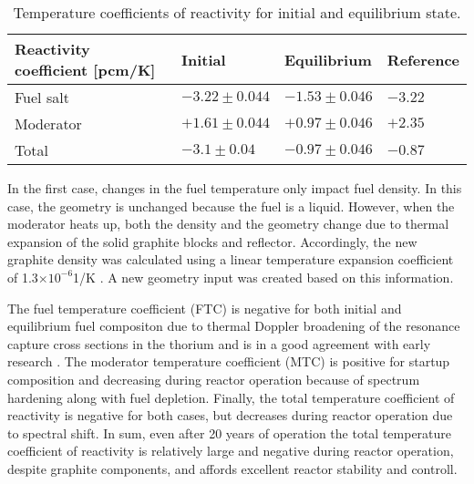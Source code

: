 \begin{table}[ht!]
  \centering
  \caption{Temperature coefficients of reactivity for initial and equilibrium state.}
\begin{tabular}{| m{} | m{} | m{} | m{} |} \hline
   Reactivity coefficient [pcm/K]  & Initial      & Equilibrium  & Reference \cite{robertson_conceptual_1971} \\ [5pt]\hline   
Fuel salt        & $-3.22\pm0.044$ & $-1.53\pm0.046$ & $-3.22$  \\ [3pt] \hline
Moderator        & $+1.61\pm0.044$ & $+0.97\pm0.046$ & $+2.35$  \\ [3pt] \hline
Total            & $-3.1\pm0.04$   & $-0.97\pm0.046$ & $-0.87$  \\ [3pt] \hline
\end{tabular}
  \label{tab:tcoef}
\end{table}
In the first case, changes in the fuel temperature only impact fuel density. In this case, the geometry is unchanged because the fuel is a liquid. However, when the moderator heats up, both the density and the geometry change due to thermal 
expansion of the solid graphite blocks and reflector. Accordingly, the new graphite density was calculated using a linear temperature expansion coefficient of 1.3$\times10^{-6}$1/K \cite{robertson_conceptual_1971}. A new geometry input was created based on this information.

The fuel temperature coefficient (FTC) is negative for both initial and equilibrium fuel compositon due to thermal Doppler broadening of the resonance capture cross sections in the thorium and is in a good agreement with early research \cite{robertson_conceptual_1971,park_whole_2015}. The moderator temperature coefficient (MTC) is positive for startup composition and decreasing during reactor operation because of spectrum hardening along with fuel depletion. Finally, the total temperature coefficient of reactivity is negative for both cases, but decreases during reactor operation due to spectral shift. In sum, even after 20 years of operation the total temperature coefficient of reactivity is relatively large and negative during reactor operation, despite graphite components, and affords excellent reactor stability and controll.

